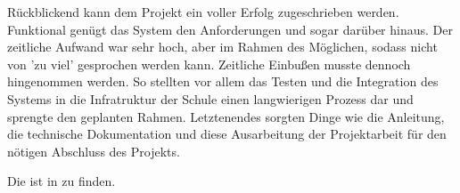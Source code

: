 \documentclass[12pt, twoside, a4paper, ngerman]{article}
\begin{document}
Rückblickend kann dem Projekt ein voller Erfolg zugeschrieben werden.
Funktional genügt das System den Anforderungen und sogar darüber hinaus. Der zeitliche Aufwand war sehr hoch, aber im Rahmen des Möglichen, sodass nicht von 'zu viel' gesprochen werden kann.
Zeitliche Einbußen musste dennoch hingenommen werden. So stellten vor allem das Testen und die Integration des Systems in die Infratruktur der Schule einen langwierigen Prozess dar und sprengte den geplanten Rahmen.
Letztenendes sorgten Dinge wie die Anleitung, die technische Dokumentation und diese Ausarbeitung der Projektarbeit für den nötigen Abschluss des Projekts.


\newpage

\pagestyle{fancy}
	\renewcommand{\sectionmark}[1]{\markboth{#1}{}}
	\fancyhf{}
	\fancyhead[L]{ { }\leftmark}
	\fancyhead[R]{\thepage}
	\renewcommand{\headrulewidth}{0.4pt}

Die ist in  zu finden.
	
\end{document}
